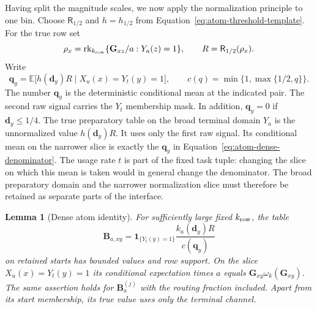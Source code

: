 \documentclass[11pt]{article}
\numberwithin{equation}{section}
\newtheorem{lemma}[theorem]{Lemma}
\theoremstyle{definition}
\theoremstyle{remark}
\begin{document}
Having split the magnitude scales, we now apply the normalization principle to one bin. Choose ${\mathsf{R}}_{1/2}$ and $h=h_{1/2}$ from
Equation~\eqref{eq:atom-threshold-template}.  For the true row set
\[
 \rho_x=\operatorname{rk}_{k_{\rm row}}
   \{{\mathbf{G}}_{xz}/a:Y_a(z)=1\},\qquad R={\mathsf{R}}_{1/2}(\rho_x).
\]
Write
\begin{equation}
 {\mathbf{q}}_y=\mathbb E\bigl[h({\mathbf{d}}_y)R\mid X_u(x)=Y_t(y)=1\bigr],
 \qquad
 c(q)=\min\{1,\max\{1/2,q\}\}.
 \label{eq:atom-dense-denominator}
\end{equation}
The number ${\mathbf{q}}_y$ is the deterministic conditional mean at the indicated
pair.  The second raw signal carries the $Y_t$ membership mask.  In
addition, ${\mathbf{q}}_y=0$ if ${\mathbf{d}}_y\le1/4$.
The true preparatory table on the broad
terminal domain $Y_a$ is the unnormalized value $h({\mathbf{d}}_y)R$.  It uses only
the first raw signal.  Its conditional mean on the narrower slice is
exactly the ${\mathbf{q}}_y$ in Equation~\eqref{eq:atom-dense-denominator}.
The usage rate $t$ is part of the fixed task tuple: changing the slice
on which this mean is taken would in general change the denominator.
The broad preparatory domain and the narrower normalization slice must
therefore be retained as separate parts of the interface.

\begin{lemma}[Dense atom identity]
\label{lem:atom-dense}
For sufficiently large fixed ${k_{\rm row}}$, the table
\begin{equation}
 {\mathbf{B}}_{a,xy}=
  \mathbf1_{\{Y_t(y)=1\}}\frac{k_a({\mathbf{d}}_y)R}{c({\mathbf{q}}_y)}
 \label{eq:atom-dense-table}
\end{equation}
on retained starts has bounded values and row support.  On the slice
$X_u(x)=Y_t(y)=1$ its conditional expectation times $a$ equals
${\mathbf{G}}_{xy}\omega_k({\mathbf{G}}_{xy})$.  The same assertion holds for
${\mathbf{B}}_a^{(j)}$ with the routing fraction included.
Apart from its start membership, its true value uses only the terminal
channel.
\end{lemma}
\end{document}

